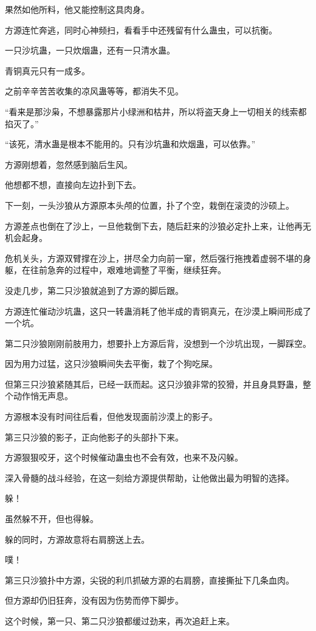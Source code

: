 \begin{this_body}
果然如他所料，他又能控制这具肉身。

方源连忙奔逃，同时心神频扫，看看手中还残留有什么蛊虫，可以抗衡。

一只沙坑蛊，一只炊烟蛊，还有一只清水蛊。

青铜真元只有一成多。

之前辛辛苦苦收集的凉风蛊等等，都消失不见。

“看来是那沙枭，不想暴露那片小绿洲和枯井，所以将盗天身上一切相关的线索都掐灭了。”

“该死，清水蛊是根本不能用的。只有沙坑蛊和炊烟蛊，可以依靠。”

方源刚想着，忽然感到脑后生风。

他想都不想，直接向左边扑到下去。

下一刻，一头沙狼从方源原本头颅的位置，扑了个空，栽倒在滚烫的沙硕上。

方源差点也倒在了沙上，一旦他栽倒下去，随后赶来的沙狼必定扑上来，让他再无机会起身。

危机关头，方源双臂撑在沙上，拼尽全力向前一窜，然后强行拖拽着虚弱不堪的身躯，在往前急奔的过程中，艰难地调整了平衡，继续狂奔。

没走几步，第二只沙狼就追到了方源的脚后跟。

方源连忙催动沙坑蛊，这只一转蛊消耗了他半成的青铜真元，在沙漠上瞬间形成了一个坑。

第二只沙狼刚刚前肢用力，想要扑上方源后背，没想到一个沙坑出现，一脚踩空。

因为用力过猛，这只沙狼瞬间失去平衡，栽了个狗吃屎。

但第三只沙狼紧随其后，已经一跃而起。这只沙狼非常的狡猾，并且身具野蛊，整个动作悄无声息。

方源根本没有时间往后看，但他发现面前沙漠上的影子。

第三只沙狼的影子，正向他影子的头部扑下来。

方源狠狠咬牙，这个时候催动蛊虫也不会有效，也来不及闪躲。

深入骨髓的战斗经验，在这一刻给方源提供帮助，让他做出最为明智的选择。

躲！

虽然躲不开，但也得躲。

躲的同时，方源故意将右肩膀送上去。

噗！

第三只沙狼扑中方源，尖锐的利爪抓破方源的右肩膀，直接撕扯下几条血肉。

但方源却仍旧狂奔，没有因为伤势而停下脚步。

这个时候，第一只、第二只沙狼都缓过劲来，再次追赶上来。


\end{this_body}
